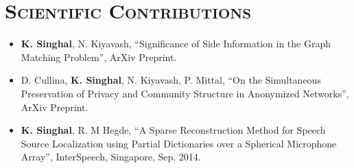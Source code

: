 \documentclass [letterpaper,10pt]{article}
\newcommand{\NewPart}[1]{\section*{\large\textsc{#1}}}
\begin{document}
\vspace{-15pt}
\NewPart{Scientific Contributions}{}
\begin{itemize}\itemsep -2.5pt
	\item{ {\bf{K. Singhal}}, N. Kiyavash, ``Significance of Side Information in the Graph Matching Problem'', ArXiv Preprint.}
	\item{D. Cullina, {\bf{K. Singhal}}, N. Kiyavash, P. Mittal, ``On the Simultaneous Preservation of Privacy and Community Structure in Anonymized Networks'', ArXiv Preprint. }
	\item{ {\bf{K. Singhal}}, R. M Hegde, ``A Sparse Reconstruction Method for Speech Source Localization using Partial Dictionaries over a Spherical Microphone Array'', InterSpeech, Singapore, Sep. 2014. }
	\vspace{-7pt}
\end{itemize}
\end{document}
